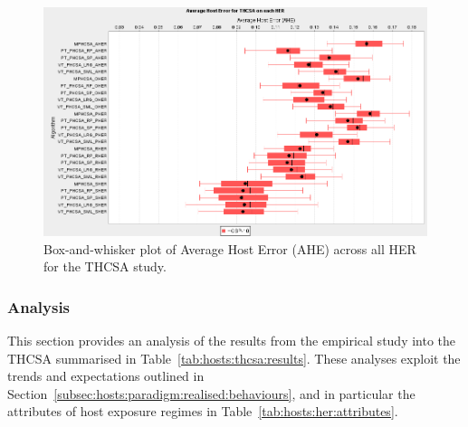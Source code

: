 \begin{figure}[htp]
	\centering
		\includegraphics[scale=0.80]{Hosts/THCSA-AHE}
	\caption{Box-and-whisker plot of Average Host Error (AHE) across all HER for the THCSA study.}
	\label{fig:hosts:thcsa:ahe:boxplot}
\end{figure}

%
%
\subsubsection{Analysis}
This section provides an analysis of the results from the empirical study into the THCSA summarised in Table~\ref{tab:hosts:thcsa:results}. These analyses exploit the trends and expectations outlined in Section~\ref{subsec:hosts:paradigm:realised:behaviours}, and in particular the attributes of host exposure regimes in Table~\ref{tab:hosts:her:attributes}.

%
%
